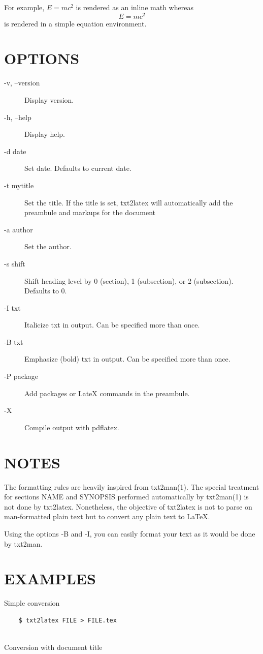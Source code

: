 For example, $E=mc^2$ is rendered as an inline math whereas 
$$ E=mc^2 $$
is rendered in a simple equation environment.
   

\section{OPTIONS}
\begin{description}
\item[-v, --version] Display version.
\item[-h, --help] Display help.
\item[-d date] Set date. Defaults to current date.
\item[-t mytitle] Set the title. If the title is set, txt2latex will 
                  automatically add the preambule and markups for the document
\item[-a author] Set the author.
\item[-s shift] Shift heading level by 0 (section), 1 (subsection), or 2 (subsection).
                Defaults to 0.
\item[-I txt] Italicize txt in output. Can be specified more than once.
\item[-B txt] Emphasize (bold) txt in output. Can be specified more than once.
\item[-P package] Add packages or LateX commands in the preambule.
\item[-X] Compile output with pdflatex.
\end{description}

\section{NOTES}
The formatting rules are heavily inspired from txt2man(1). 
The special treatment for sections NAME and SYNOPSIS performed 
automatically by txt2man(1) is not done by txt2latex.
Nonetheless, the objective of txt2latex is not to parse on man-formatted
plain text but to convert any plain text to \LaTeX. 

Using the options -B and -I, you can easily format your text as it 
would be done by txt2man. 

\section{EXAMPLES}
Simple conversion

\begin{verbatim}
    $ txt2latex FILE > FILE.tex
  
\end{verbatim}
Conversion with document title

